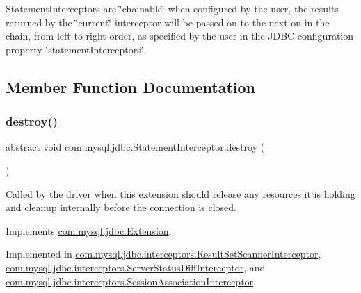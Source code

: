Statement\+Interceptors are \char`\"{}chainable\char`\"{} when configured by the user, the results returned by the \char`\"{}current\char`\"{} interceptor will be passed on to the next on in the chain, from left-\/to-\/right order, as specified by the user in the J\+D\+BC configuration property \char`\"{}statement\+Interceptors\char`\"{}. 

\subsection{Member Function Documentation}
\mbox{\label{interfacecom_1_1mysql_1_1jdbc_1_1_statement_interceptor_a5da9bea29735c87ac10a67c34dcee9ef}} 
\subsubsection{\texorpdfstring{destroy()}{destroy()}}
{\footnotesize\ttfamily abstract void com.\+mysql.\+jdbc.\+Statement\+Interceptor.\+destroy (\begin{DoxyParamCaption}{ }\end{DoxyParamCaption})\hspace{0.3cm}{\ttfamily [abstract]}}

Called by the driver when this extension should release any resources it is holding and cleanup internally before the connection is closed. 

Implements \mbox{\hyperlink{interfacecom_1_1mysql_1_1jdbc_1_1_extension_a7d9644de305efed5df71f3fcc7cc1772}{com.\+mysql.\+jdbc.\+Extension}}.



Implemented in \mbox{\hyperlink{classcom_1_1mysql_1_1jdbc_1_1interceptors_1_1_result_set_scanner_interceptor_af097ba3f65b6aa1713d425a06e02d14b}{com.\+mysql.\+jdbc.\+interceptors.\+Result\+Set\+Scanner\+Interceptor}}, \mbox{\hyperlink{classcom_1_1mysql_1_1jdbc_1_1interceptors_1_1_server_status_diff_interceptor_a54edef982686f41b6d328571956a5fca}{com.\+mysql.\+jdbc.\+interceptors.\+Server\+Status\+Diff\+Interceptor}}, and \mbox{\hyperlink{classcom_1_1mysql_1_1jdbc_1_1interceptors_1_1_session_association_interceptor_a4ec0e8dc4e3cac14db72e76f82ddae56}{com.\+mysql.\+jdbc.\+interceptors.\+Session\+Association\+Interceptor}}.

